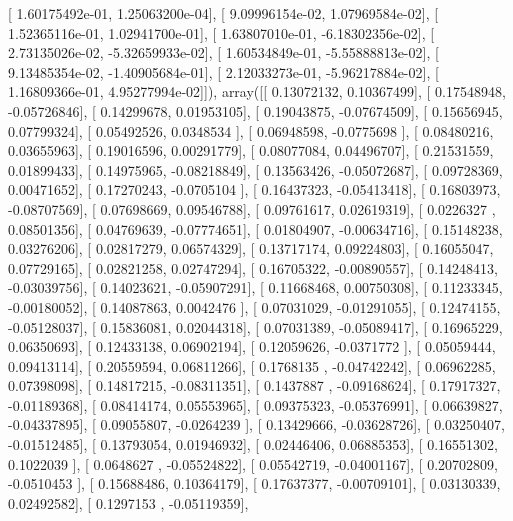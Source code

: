 \documentclass{article}
\begin{document}
       [  1.60175492e-01,   1.25063200e-04],
       [  9.09996154e-02,   1.07969584e-02],
       [  1.52365116e-01,   1.02941700e-01],
       [  1.63807010e-01,  -6.18302356e-02],
       [  2.73135026e-02,  -5.32659933e-02],
       [  1.60534849e-01,  -5.55888813e-02],
       [  9.13485354e-02,  -1.40905684e-01],
       [  2.12033273e-01,  -5.96217884e-02],
       [  1.16809366e-01,   4.95277994e-02]]), array([[ 0.13072132,  0.10367499],
       [ 0.17548948, -0.05726846],
       [ 0.14299678,  0.01953105],
       [ 0.19043875, -0.07674509],
       [ 0.15656945,  0.07799324],
       [ 0.05492526,  0.0348534 ],
       [ 0.06948598, -0.0775698 ],
       [ 0.08480216,  0.03655963],
       [ 0.19016596,  0.00291779],
       [ 0.08077084,  0.04496707],
       [ 0.21531559,  0.01899433],
       [ 0.14975965, -0.08218849],
       [ 0.13563426, -0.05072687],
       [ 0.09728369,  0.00471652],
       [ 0.17270243, -0.0705104 ],
       [ 0.16437323, -0.05413418],
       [ 0.16803973, -0.08707569],
       [ 0.07698669,  0.09546788],
       [ 0.09761617,  0.02619319],
       [ 0.0226327 ,  0.08501356],
       [ 0.04769639, -0.07774651],
       [ 0.01804907, -0.00634716],
       [ 0.15148238,  0.03276206],
       [ 0.02817279,  0.06574329],
       [ 0.13717174,  0.09224803],
       [ 0.16055047,  0.07729165],
       [ 0.02821258,  0.02747294],
       [ 0.16705322, -0.00890557],
       [ 0.14248413, -0.03039756],
       [ 0.14023621, -0.05907291],
       [ 0.11668468,  0.00750308],
       [ 0.11233345, -0.00180052],
       [ 0.14087863,  0.0042476 ],
       [ 0.07031029, -0.01291055],
       [ 0.12474155, -0.05128037],
       [ 0.15836081,  0.02044318],
       [ 0.07031389, -0.05089417],
       [ 0.16965229,  0.06350693],
       [ 0.12433138,  0.06902194],
       [ 0.12059626, -0.0371772 ],
       [ 0.05059444,  0.09413114],
       [ 0.20559594,  0.06811266],
       [ 0.1768135 , -0.04742242],
       [ 0.06962285,  0.07398098],
       [ 0.14817215, -0.08311351],
       [ 0.1437887 , -0.09168624],
       [ 0.17917327, -0.01189368],
       [ 0.08414174,  0.05553965],
       [ 0.09375323, -0.05376991],
       [ 0.06639827, -0.04337895],
       [ 0.09055807, -0.0264239 ],
       [ 0.13429666, -0.03628726],
       [ 0.03250407, -0.01512485],
       [ 0.13793054,  0.01946932],
       [ 0.02446406,  0.06885353],
       [ 0.16551302,  0.1022039 ],
       [ 0.0648627 , -0.05524822],
       [ 0.05542719, -0.04001167],
       [ 0.20702809, -0.0510453 ],
       [ 0.15688486,  0.10364179],
       [ 0.17637377, -0.00709101],
       [ 0.03130339,  0.02492582],
       [ 0.1297153 , -0.05119359],
\end{document}
